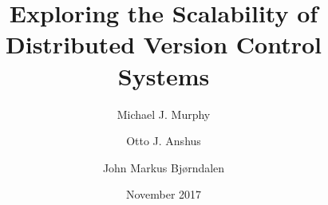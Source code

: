 \documentclass[
    usenglish,
]{nik}
\title{Exploring the Scalability of Distributed Version Control Systems}
\author{Michael J. Murphy \and Otto J. Anshus \and John Markus Bjørndalen}
\date{November 2017}
\begin{document}
\maketitle

\begin{abstract}

\end{abstract}







\printbibliography[]

\listoftodos

\ifoptionfinal{}{
    
}
\end{document}
